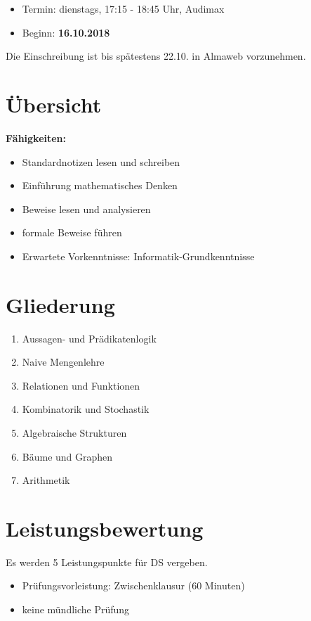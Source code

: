 \documentclass[diskretestrukturen.tex]{subfiles}
\begin{document}
  \begin{itemize}
    \item Termin: dienstags, 17:15 - 18:45 Uhr, Audimax
    \item Beginn: \textbf{16.10.2018}
  \end{itemize}

  Die Einschreibung ist bis sp\"atestens 22.10. in Almaweb vorzunehmen.

  \section*{\"Ubersicht}
  \textbf{F\"ahigkeiten:}

  \begin{itemize}
    \item Standardnotizen lesen und schreiben
    \item Einf\"uhrung mathematisches Denken
    \item Beweise lesen und analysieren
    \item formale Beweise f\"uhren
  \end{itemize}

  \begin{itemize}
    \item Erwartete Vorkenntnisse: Informatik-Grundkenntnisse
  \end{itemize}


  \section*{Gliederung}
  \begin{enumerate}
    \item Aussagen- und Pr\"adikatenlogik
    \item Naive Mengenlehre
    \item Relationen und Funktionen
    \item Kombinatorik und Stochastik
    \item Algebraische Strukturen
    \item B\"aume und Graphen
    \item Arithmetik
  \end{enumerate}


  \section*{Leistungsbewertung}
  Es werden 5 Leistungspunkte f\"ur DS vergeben.
  \begin{itemize}
    \item Pr\"ufungsvorleistung: Zwischenklausur (60 Minuten)
    \item keine m\"undliche Pr\"ufung
  \end{itemize}
\end{document}

